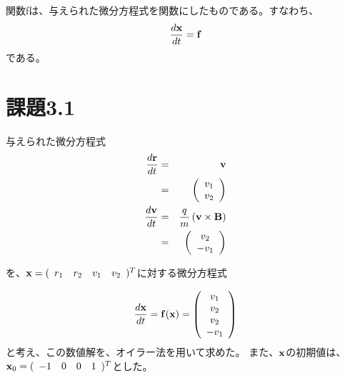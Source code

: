 \documentclass[11pt]{jsarticle}
\newcommand{\xb}{{\bf x}}
\newcommand{\fb}{{\bf f}}
\begin{document}
                関数fは、与えられた微分方程式を関数にしたものである。すなわち、
                \begin{eqnarray}
                    \frac{d{\bf x}}{dt} = {\bf f}
                \end{eqnarray}
                である。

    \section{課題3.1}
        与えられた微分方程式
        \begin{eqnarray*}
            \frac{d{\bf r}}{dt} & = & {\bf v} \\
                                & = & \left(
                                          \begin{array}{c}
                                              v_1 \\
                                              v_2
                                          \end{array}
                                      \right) \\
            \frac{d{\bf v}}{dt} & = & \frac{q}{m}\left( {\bf v} \times {\bf B} \right) \\
                                & = & \left(
                                          \begin{array}{c}
                                              v_2 \\
                                              - v_1
                                          \end{array}
                                      \right) \\
        \end{eqnarray*}

        を、$\xb = (\begin{array}{cccc} r_1 & r_2 & v_1 & v_2 \end{array})^T$に対する微分方程式

        \begin{eqnarray}
            \frac{d\xb}{dt} = \fb(\xb) = \left(
                                             \begin{array}{c}
                                              v_1 \\
                                              v_2 \\
                                              v_2 \\
                                              - v_1 
                                             \end{array}
                                         \right)
            \label{eq1}
        \end{eqnarray}
        と考え、この数値解を、オイラー法を用いて求めた。
        また、$\xb$の初期値は、$\xb_0 = (\begin{array}{cccc} -1 & 0 & 0 & 1 \end{array})^T$とした。
\end{document}
